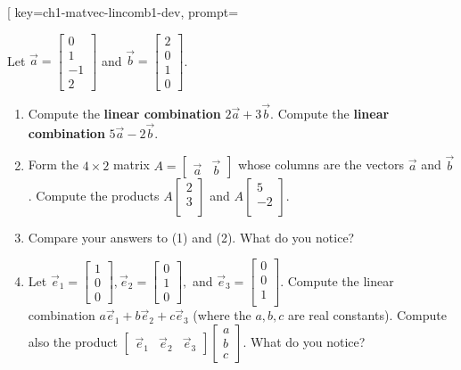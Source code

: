 

\begin{SaveQuestion}[
        key=ch1-matvec-lincomb1-dev,
        prompt={Let $\vec a = \begin{bmatrix} 0 \\ 1 \\ -1 \\ 2 \end{bmatrix}$ and $\vec b = \begin{bmatrix} 2 \\ 0 \\ 1 \\ 0 \end{bmatrix}$. 
\begin{enumerate}
	   \item Compute the {\bf linear combination} $2 \vec a + 3 \vec b.$ Compute  the {\bf linear combination} $5 \vec a - 2 \vec b$.
	   \item Form the $4 \times 2$ matrix $A = \begin{bmatrix} \vec a & \vec b\end{bmatrix}$  whose columns are the vectors $\vec a$ and $\vec b$. Compute the products 
	$A \begin{bmatrix} 2 \\ 3 \\ \end{bmatrix} $ and $A \begin{bmatrix} 5 \\ -2 \\ \end{bmatrix}$.
	   \item Compare your answers to (1) and (2). What do you notice? 
	   \item Let $\vec e_1 =  \begin{bmatrix} 1 \\ 0 \\ 0 \end{bmatrix}, \vec e_2 = \begin{bmatrix} 0 \\ 1 \\ 0 \end{bmatrix},$ and $ \vec e_3 = \begin{bmatrix} 0 \\ 0\\1\\ \end{bmatrix}$. Compute the linear combination $a \vec e_1 + b \vec e_2 + c \vec e_3$ (where the $a, b, c$ are real constants). Compute also the product $ \begin{bmatrix} \vec e_1 & \vec e_2 & \vec e_3 \end{bmatrix}  \begin{bmatrix} a \\ b \\ c \end{bmatrix}.$ What do you notice?

\end{enumerate}}
\end{SaveQuestion}
